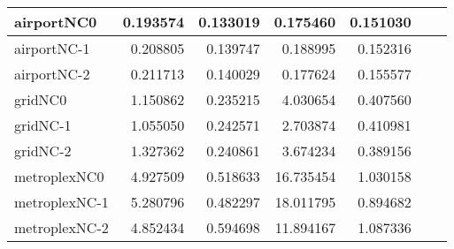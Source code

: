 \documentclass[../../../thesis.tex]{subfiles}
\begin{document}
\begin{longtable}{|l|r|r|r|r|r|r|}
airportNC0 & 0.193574 & 0.133019 & 0.175460 & 0.151030 \\ \hline
airportNC-1 & 0.208805 & 0.139747 & 0.188995 & 0.152316 \\ \hline
airportNC-2 & 0.211713 & 0.140029 & 0.177624 & 0.155577 \\ \hline
gridNC0 & 1.150862 & 0.235215 & 4.030654 & 0.407560 \\ \hline
gridNC-1 & 1.055050 & 0.242571 & 2.703874 & 0.410981 \\ \hline
gridNC-2 & 1.327362 & 0.240861 & 3.674234 & 0.389156 \\ \hline
metroplexNC0 & 4.927509 & 0.518633 & 16.735454 & 1.030158 \\ \hline
metroplexNC-1 & 5.280796 & 0.482297 & 18.011795 & 0.894682 \\ \hline
metroplexNC-2 & 4.852434 & 0.594698 & 11.894167 & 1.087336 \\ \hline
\end{longtable}
\end{document}
